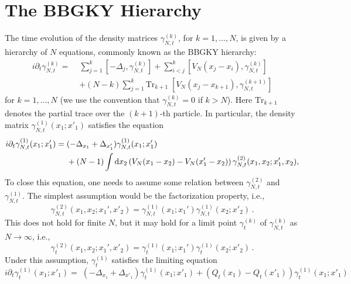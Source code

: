 \documentclass[11pt]{article}
\newcommand{\rd}{{\rm d}}
\newcommand{\be}{\begin{equation}}
\newcommand{\ee}{\end{equation}}
\newcommand{\tr}{\mbox{Tr}}
\begin{document}
\section{The BBGKY Hierarchy}\label{sec:bb}

The time evolution of the density matrices $\gamma_{N,t}^{(k)}$, for
$k=1,\dots, N$, is given by a hierarchy of $N$ equations, commonly
known as the BBGKY hierarchy:
\begin{equation}\label{eq:BBGKY}
\begin{split}
i\partial_t \gamma^{(k)}_{N,t} = \; &
\sum_{j=1}^k \left[ -\Delta_j ,
\gamma^{(k)}_{N,t} \right] + \sum_{i<j}^k \left[ V_N (x_j - x_i) ,
\gamma^{(k)}_{N,t} \right] \\ &
+ (N-k) \sum_{j=1}^k \tr_{k+1} \;
\left[ V_N (x_j -x_{k+1}), \gamma^{(k+1)}_{N,t} \right]
\end{split}
\end{equation}
for $k =1, \dots ,N$ (we use the convention that
$\gamma_{N,t}^{(k)}=0$ if $k >N$). Here $\tr_{k+1}$ denotes the
partial trace over the $(k+1)$-th particle. In particular, the
density matrix $\gamma_{N,t}^{(1)} (x_1;x'_1)$ satisfies the
equation
\begin{equation}\label{1.1}
\begin{split}
i\partial_t \gamma_{N,t}^{(1)} ({x}_1 ; {x}'_1) = \; &(-\Delta_{x_1}
+ \Delta_{x'_1}) \gamma_{N,t}^{(1)} ({x}_1; {x}'_1) \\& + (N -1)
\int \rd x_{2} \left( V_N (x_1 - x_{2}) - V_N (x'_1 - x_{2}) \right)
\gamma_{N,t}^{(2)} ({x}_1 , x_{2};{x}'_1 , x_{2}),
\end{split}
\end{equation}
To close this equation, one needs to assume some
relation between
$\gamma_{N,t}^{(2)}$ and $\gamma_{N,t}^{(1)}$. The simplest
assumption would be  the factorization property, i.e., \be
\gamma^{(2)}_{N, t} (x_1, x_2; x_1', x'_2) = \gamma^{(1)}_{N,t}
(x_1; x_1') \gamma^{(1)}_{N,t} (x_2; x'_2) \, . \ee This does not
hold for finite $N$, but it may hold for a limit point
$\gamma^{(k)}_{t}$ of $\gamma^{(k)}_{N, t}$ as $N\to \infty$, i.e.,
\be\label{g2} \gamma^{(2)}_{t} (x_1, x_2; x_1', x'_2) =
\gamma^{(1)}_{t} (x_1; x_1') \gamma^{(1)}_{t} (x_2; x'_2) \, . \ee
Under this assumption, $\gamma_{t}^{(1)}$ satisfies the limiting
equation
\begin{equation}\label{1.2}
i\partial_t \gamma_{t}^{(1)} ({x}_1; {x}'_1) = \; (-\Delta_{x_1} +
\Delta_{x'_1}) \gamma_{t}^{(1)} ({x}_1; {x}'_1) +  \left( Q_t(x_1)
-Q_t(x'_1)\right) \gamma_{t}^{(1)} ({x}_1; {x}'_1)
\end{equation}
\end{document}
